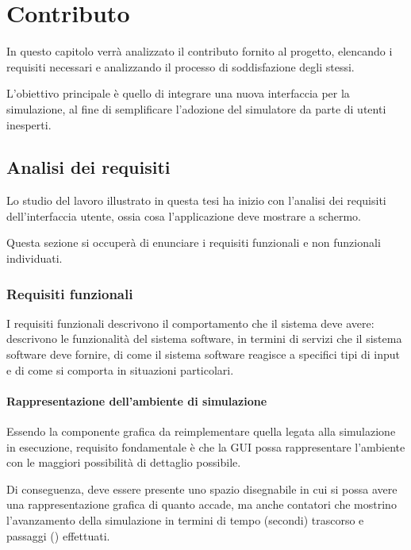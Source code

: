 
\chapter{Contributo}\label{ch:contributo}
    In questo capitolo verrà analizzato il contributo fornito al progetto, elencando i requisiti necessari e analizzando il processo di soddisfazione degli stessi.

    L'obiettivo principale è quello di integrare una nuova interfaccia per la simulazione, al fine di semplificare l'adozione del simulatore da parte di utenti inesperti.

    \section{Analisi dei requisiti}\label{sec:analisi}
        Lo studio del lavoro illustrato in questa tesi ha inizio con l'analisi dei requisiti dell'interfaccia utente, ossia cosa l'applicazione deve mostrare a schermo.

        Questa sezione si occuperà di enunciare i requisiti funzionali e non funzionali individuati.

        \subsection{Requisiti funzionali}\label{subsec:funzionali}
            I requisiti funzionali descrivono il comportamento che il sistema deve avere:
            descrivono le funzionalità del sistema software, in termini di servizi che il sistema software deve fornire, di come il sistema software reagisce a specifici tipi di input e di come si comporta in situazioni particolari.

            \subsubsection{Rappresentazione dell'ambiente di simulazione}\label{subsubsec:seeEnv}
                Essendo la componente grafica da reimplementare quella legata alla simulazione in esecuzione, requisito fondamentale è che la GUI possa rappresentare l'ambiente con le maggiori possibilità di dettaglio possibile.

                Di conseguenza, deve essere presente uno spazio disegnabile in cui si possa avere una rappresentazione grafica di quanto accade, ma anche contatori che mostrino l'avanzamento della simulazione in termini di tempo (secondi) trascorso e passaggi () effettuati.

